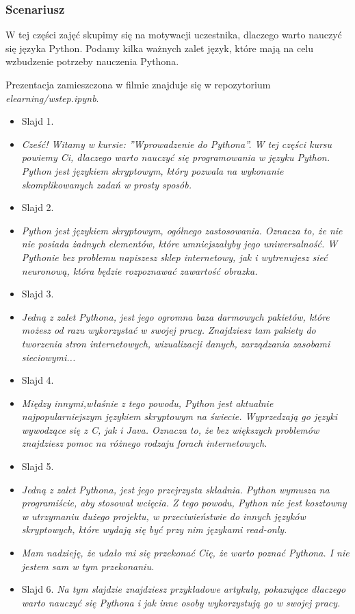 \documentclass{mwart}
\begin{document}
\subsubsection{Scenariusz}
W tej części zajęć skupimy się na motywacji uczestnika, dlaczego warto
nauczyć się języka Python. Podamy kilka ważnych zalet język, które mają na celu
wzbudzenie potrzeby nauczenia Pythona.

Prezentacja zamieszczona w filmie znajduje się w repozytorium
\emph{elearning/wstep.ipynb}.

\begin{itemize}
  \item Slajd 1.
  \item \emph{Cześć! Witamy w kursie: ''Wprowadzenie do Pythona''. W tej części kursu
      powiemy Ci, dlaczego warto nauczyć się programowania w
      języku Python. Python jest językiem skryptowym, który pozwala na wykonanie
      skomplikowanych zadań w prosty sposób.}
  \item Slajd 2.
  \item \emph{Python jest językiem skryptowym, ogólnego zastosowania. Oznacza to, że nie
      nie posiada żadnych elementów, które umniejszałyby jego uniwersalność. W Pythonie
      bez problemu napiszesz sklep internetowy, jak i wytrenujesz sieć neuronową, która
      będzie rozpoznawać zawartość obrazka.}
  \item Slajd 3.
  \item \emph{Jedną z zalet Pythona, jest jego ogromna baza darmowych pakietów, które
      możesz od razu wykorzystać w swojej pracy. Znajdziesz tam pakiety do tworzenia
      stron internetowych, wizualizacji danych, zarządzania zasobami sieciowymi...}
  \item Slajd 4.
  \item \emph{Między innymi,właśnie z tego powodu, Python jest aktualnie najpopularniejszym
      językiem skryptowym na świecie. Wyprzedzają go języki wywodzące się z C, jak i
      Java. Oznacza to, że bez większych problemów znajdziesz pomoc na różnego rodzaju
      forach internetowych.}
  \item Slajd 5.
  \item \emph{Jedną z zalet Pythona, jest jego przejrzysta składnia. Python wymusza na
      programiście, aby stosował wcięcia. Z tego powodu, Python nie jest kosztowny w
      utrzymaniu dużego projektu, w przeciwieństwie do innych języków skryptowych, które wydają się być przy
      nim językami read-only.}
  \item \emph{Mam nadzieję, że udało mi się przekonać Cię, że warto poznać Pythona. I
      nie jestem sam w tym przekonaniu.}
  \item Slajd 6.
    \emph{Na tym slajdzie znajdziesz przykładowe artykuły, pokazujące dlaczego warto nauczyć się
      Pythona i jak inne osoby wykorzystują go w swojej pracy.}
\end{itemize}
\end{document}
